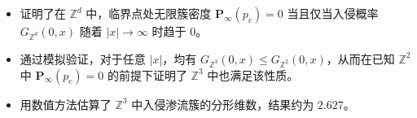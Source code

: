 

\begin{itemize}[nosep]
  \item 证明了在 $\mathbb{Z}^d$ 中，临界点处无限簇密度 $\mathbf{P}_{\infty}(p_c)=0$ 当且仅当入侵概率 $G_{\mathbb{Z}^d}(0,x)$ 随着 $|x|\rightarrow\infty$ 时趋于 0。
  \item 通过模拟验证，对于任意 $|x|$，均有 $G_{\mathbb{Z}^3}(0,x)\leq G_{\mathbb{Z}^2}(0,x)$，从而在已知 $\mathbb{Z}^2$ 中 $\mathbf{P}_{\infty}(p_c)=0$ 的前提下证明了 $\mathbb{Z}^3$ 中也满足该性质。
  \item 用数值方法估算了 $\mathbb{Z}^3$ 中入侵渗流簇的分形维数，结果约为 $2.627$。
\end{itemize}
